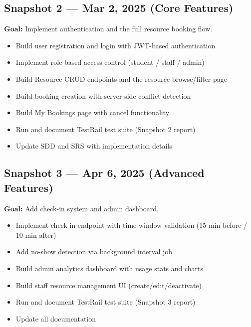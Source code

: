 \documentclass[12pt]{article}
\begin{document}
\subsection{Snapshot 2 --- Mar 2, 2025 (Core Features)}
\textbf{Goal:} Implement authentication and the full resource booking flow.
\begin{itemize}
    \item Build user registration and login with JWT-based authentication
    \item Implement role-based access control (student / staff / admin)
    \item Build Resource CRUD endpoints and the resource browse/filter page
    \item Build booking creation with server-side conflict detection
    \item Build My Bookings page with cancel functionality
    \item Run and document TestRail test suite (Snapshot 2 report)
    \item Update SDD and SRS with implementation details
\end{itemize}

\subsection{Snapshot 3 --- Apr 6, 2025 (Advanced Features)}
\textbf{Goal:} Add check-in system and admin dashboard.
\begin{itemize}
    \item Implement check-in endpoint with time-window validation (15 min before / 10 min after)
    \item Add no-show detection via background interval job
    \item Build admin analytics dashboard with usage stats and charts
    \item Build staff resource management UI (create/edit/deactivate)
    \item Run and document TestRail test suite (Snapshot 3 report)
    \item Update all documentation
\end{itemize}
\end{document}
